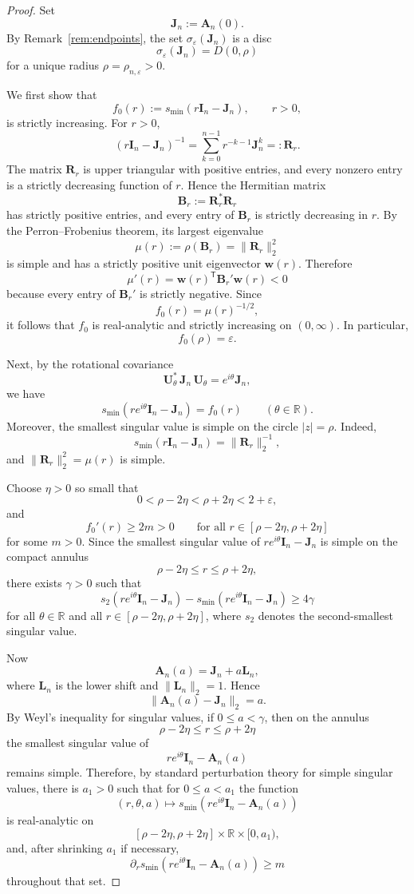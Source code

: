 \documentclass[11pt]{article}
\newcommand{\R}{\mathbb{R}}
\begin{document}
\begin{proof}
Set
\[
\mathbf J_n:=\mathbf A_n(0).
\]
By Remark~\ref{rem:endpoints}, the set \(\sigma_\varepsilon(\mathbf J_n)\) is a disc
\[
\sigma_\varepsilon(\mathbf J_n)=D(0,\rho)
\]
for a unique radius \(\rho=\rho_{n,\varepsilon}>0\).

We first show that
\[
f_0(r):=s_{\min}(r\mathbf I_n-\mathbf J_n),\qquad r>0,
\]
is strictly increasing. For \(r>0\),
\[
(r\mathbf I_n-\mathbf J_n)^{-1}
=
\sum_{k=0}^{n-1} r^{-k-1}\mathbf J_n^k
=: \mathbf R_r.
\]
The matrix \(\mathbf R_r\) is upper triangular with positive entries, and every nonzero entry is a strictly decreasing function of \(r\). Hence the Hermitian matrix
\[
\mathbf B_r:=\mathbf R_r^*\mathbf R_r
\]
has strictly positive entries, and every entry of \(\mathbf B_r\) is strictly decreasing in \(r\). By the Perron--Frobenius theorem, its largest eigenvalue
\[
\mu(r):=\rho(\mathbf B_r)=\|\mathbf R_r\|_2^2
\]
is simple and has a strictly positive unit eigenvector \(\mathbf w(r)\). Therefore
\[
\mu'(r)=\mathbf w(r)^{\mathsf T}\mathbf B_r'\mathbf w(r)<0
\]
because every entry of \(\mathbf B_r'\) is strictly negative. Since
\[
f_0(r)=\mu(r)^{-1/2},
\]
it follows that \(f_0\) is real-analytic and strictly increasing on \((0,\infty)\). In particular,
\[
f_0(\rho)=\varepsilon.
\]

Next, by the rotational covariance
\[
\mathbf U_\theta^*\,\mathbf J_n\,\mathbf U_\theta=e^{i\theta}\mathbf J_n,
\]
we have
\[
s_{\min}(re^{i\theta}\mathbf I_n-\mathbf J_n)=f_0(r)
\qquad (\theta\in\R).
\]
Moreover, the smallest singular value is simple on the circle \(|z|=\rho\). Indeed,
\[
s_{\min}(r\mathbf I_n-\mathbf J_n)=\|\mathbf R_r\|_2^{-1},
\]
and \(\|\mathbf R_r\|_2^2=\mu(r)\) is simple.

Choose \(\eta>0\) so small that
\[
0<\rho-2\eta<\rho+2\eta<2+\varepsilon,
\]
and
\[
f_0'(r)\ge 2m>0
\qquad \text{for all } r\in[\rho-2\eta,\rho+2\eta]
\]
for some \(m>0\). Since the smallest singular value of
\(re^{i\theta}\mathbf I_n-\mathbf J_n\) is simple on the compact annulus
\[
\rho-2\eta\le r\le \rho+2\eta,
\]
there exists \(\gamma>0\) such that
\[
s_2(re^{i\theta}\mathbf I_n-\mathbf J_n)-s_{\min}(re^{i\theta}\mathbf I_n-\mathbf J_n)\ge 4\gamma
\]
for all \(\theta\in\R\) and all \(r\in[\rho-2\eta,\rho+2\eta]\), where \(s_2\) denotes the second-smallest singular value.

Now
\[
\mathbf A_n(a)=\mathbf J_n+a\mathbf L_n,
\]
where \(\mathbf L_n\) is the lower shift and \(\|\mathbf L_n\|_2=1\). Hence
\[
\|\mathbf A_n(a)-\mathbf J_n\|_2=a.
\]
By Weyl's inequality for singular values, if \(0\le a<\gamma\), then on the annulus
\[
\rho-2\eta\le r\le \rho+2\eta
\]
the smallest singular value of
\[
re^{i\theta}\mathbf I_n-\mathbf A_n(a)
\]
remains simple. Therefore, by standard perturbation theory for simple singular values, there is \(a_1>0\) such that for \(0\le a<a_1\) the function
\[
(r,\theta,a)\longmapsto s_{\min}(re^{i\theta}\mathbf I_n-\mathbf A_n(a))
\]
is real-analytic on
\[
[\rho-2\eta,\rho+2\eta]\times \R \times [0,a_1),
\]
and, after shrinking \(a_1\) if necessary,
\[
\partial_r s_{\min}(re^{i\theta}\mathbf I_n-\mathbf A_n(a))\ge m
\]
throughout that set.


\end{proof}
\end{document}
